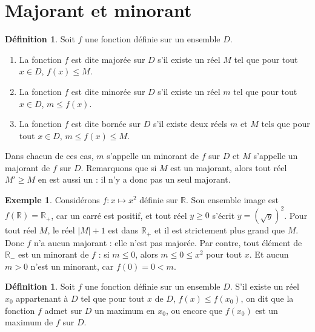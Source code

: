 \documentclass[12pt,a4paper]{article}
\theoremstyle{plain}
\theoremstyle{definition}
\newtheorem{definition}[theorem]{Définition}
\newtheorem{example}[theorem]{Exemple}
\theoremstyle{remark}
\begin{document}
\section{Majorant et minorant}

\begin{tcolorbox}[navybar]
  \begin{definition}
    Soit $f$ une fonction définie sur un ensemble $D$.
    \begin{enumerate}[label=(\roman*)]
      \item\label{def:majoree} La fonction $f$ est dite majorée sur $D$ s'il existe un
      réel $M$ tel que pour tout $x \in D$, $f(x) \le M$.
      \item\label{def:minoree} La fonction $f$ est dite minorée sur $D$ s'il existe un
      réel $m$ tel que pour tout $x \in D$, $m \le f(x)$.
      \item\label{def:bornee} La fonction $f$ est dite bornée sur $D$ s'il existe deux
      réels $m$ et $M$ tels que pour tout $x \in D$, $m \le f(x) \le M$.
    \end{enumerate}
  \end{definition}
\end{tcolorbox}

Dans chacun de ces cas, $m$ s'appelle un minorant de $f$ sur $D$ et $M$ s'appelle un
majorant de $f$ sur $D$. Remarquons que si $M$ est un majorant, alors tout réel
$M' \ge M$ en est aussi un : il n'y a donc pas un seul majorant.

\begin{example}
  Considérons $f : x \mapsto x^2$ définie sur $\mathbb{R}$. Son ensemble image est
  $f(\mathbb{R}) = \mathbb{R}_+$, car un carré est positif, et tout réel $y \ge 0$
  s'écrit $y = (\sqrt{y})^2$. Pour tout réel $M$, le réel $\lvert M \rvert + 1$ est
  dans $\mathbb{R}_+$ et il est strictement plus grand que $M$. Donc $f$ n'a aucun
  majorant : elle n'est pas majorée. Par contre, tout élément de $\mathbb{R}_-$ est
  un minorant de $f$ : si $m \le 0$, alors $m \le 0 \le x^2$ pour tout $x$. Et aucun
  $m > 0$ n'est un minorant, car $f(0) = 0 < m$.
\end{example}

\begin{tcolorbox}[navybar]
  \begin{definition}
    Soit $f$ une fonction définie sur un ensemble $D$. S'il existe un réel $x_0$
    appartenant à $D$ tel que pour tout $x$ de $D$, $f(x) \le f(x_0)$, on dit que la
    fonction $f$ admet sur $D$ un maximum en $x_0$, ou encore que $f(x_0)$ est un
    maximum de $f$ sur $D$.
  \end{definition}
\end{tcolorbox}
\end{document}
